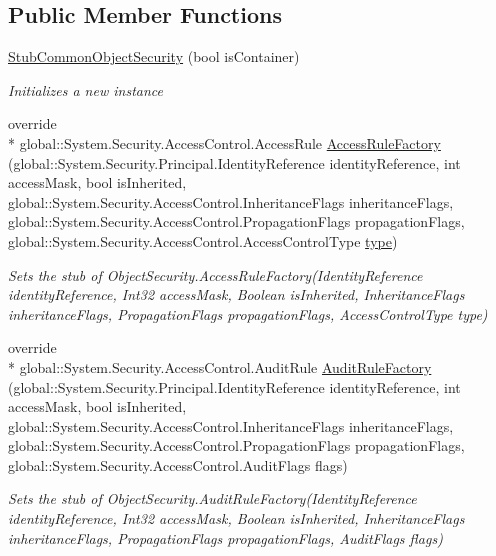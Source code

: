 \subsection*{Public Member Functions}
\begin{DoxyCompactItemize}
\item 
\hyperlink{class_system_1_1_security_1_1_access_control_1_1_fakes_1_1_stub_common_object_security_a7b79263adbab872351d6f00c3ce00214}{Stub\-Common\-Object\-Security} (bool is\-Container)
\begin{DoxyCompactList}\small\item\em Initializes a new instance\end{DoxyCompactList}\item 
override \\*
global\-::\-System.\-Security.\-Access\-Control.\-Access\-Rule \hyperlink{class_system_1_1_security_1_1_access_control_1_1_fakes_1_1_stub_common_object_security_ad85efc5bcb96c5c85de7d2fff3c95216}{Access\-Rule\-Factory} (global\-::\-System.\-Security.\-Principal.\-Identity\-Reference identity\-Reference, int access\-Mask, bool is\-Inherited, global\-::\-System.\-Security.\-Access\-Control.\-Inheritance\-Flags inheritance\-Flags, global\-::\-System.\-Security.\-Access\-Control.\-Propagation\-Flags propagation\-Flags, global\-::\-System.\-Security.\-Access\-Control.\-Access\-Control\-Type \hyperlink{jquery-1_810_82-vsdoc_8js_a3940565e83a9bfd10d95ffd27536da91}{type})
\begin{DoxyCompactList}\small\item\em Sets the stub of Object\-Security.\-Access\-Rule\-Factory(\-Identity\-Reference identity\-Reference, Int32 access\-Mask, Boolean is\-Inherited, Inheritance\-Flags inheritance\-Flags, Propagation\-Flags propagation\-Flags, Access\-Control\-Type type)\end{DoxyCompactList}\item 
override \\*
global\-::\-System.\-Security.\-Access\-Control.\-Audit\-Rule \hyperlink{class_system_1_1_security_1_1_access_control_1_1_fakes_1_1_stub_common_object_security_a3f209b046ef8261c72eeff0ac730e53a}{Audit\-Rule\-Factory} (global\-::\-System.\-Security.\-Principal.\-Identity\-Reference identity\-Reference, int access\-Mask, bool is\-Inherited, global\-::\-System.\-Security.\-Access\-Control.\-Inheritance\-Flags inheritance\-Flags, global\-::\-System.\-Security.\-Access\-Control.\-Propagation\-Flags propagation\-Flags, global\-::\-System.\-Security.\-Access\-Control.\-Audit\-Flags flags)
\begin{DoxyCompactList}\small\item\em Sets the stub of Object\-Security.\-Audit\-Rule\-Factory(\-Identity\-Reference identity\-Reference, Int32 access\-Mask, Boolean is\-Inherited, Inheritance\-Flags inheritance\-Flags, Propagation\-Flags propagation\-Flags, Audit\-Flags flags)\end{DoxyCompactList}\item 

\end{DoxyCompactItemize}
